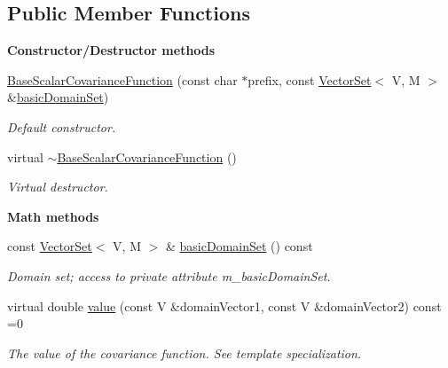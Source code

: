 \subsection*{Public Member Functions}
\begin{Indent}{\bf Constructor/\-Destructor methods}\par
\begin{DoxyCompactItemize}
\item 
\hyperlink{class_q_u_e_s_o_1_1_base_scalar_covariance_function_a7a3d53a332dffce97c5579d93eaf91ff}{Base\-Scalar\-Covariance\-Function} (const char $\ast$prefix, const \hyperlink{class_q_u_e_s_o_1_1_vector_set}{Vector\-Set}$<$ V, M $>$ \&\hyperlink{class_q_u_e_s_o_1_1_base_scalar_covariance_function_a703aa6a8e475adaface0ec514b48a5bc}{basic\-Domain\-Set})
\begin{DoxyCompactList}\small\item\em Default constructor. \end{DoxyCompactList}\item 
virtual \hyperlink{class_q_u_e_s_o_1_1_base_scalar_covariance_function_a5db872c7f5929e819543f7f58063f3ae}{$\sim$\-Base\-Scalar\-Covariance\-Function} ()
\begin{DoxyCompactList}\small\item\em Virtual destructor. \end{DoxyCompactList}\end{DoxyCompactItemize}
\end{Indent}
\begin{Indent}{\bf Math methods}\par
\begin{DoxyCompactItemize}
\item 
const \hyperlink{class_q_u_e_s_o_1_1_vector_set}{Vector\-Set}$<$ V, M $>$ \& \hyperlink{class_q_u_e_s_o_1_1_base_scalar_covariance_function_a703aa6a8e475adaface0ec514b48a5bc}{basic\-Domain\-Set} () const 
\begin{DoxyCompactList}\small\item\em Domain set; access to private attribute m\-\_\-basic\-Domain\-Set. \end{DoxyCompactList}\item 
virtual double \hyperlink{class_q_u_e_s_o_1_1_base_scalar_covariance_function_a93a35146e106c7fb28913c604a918acb}{value} (const V \&domain\-Vector1, const V \&domain\-Vector2) const =0
\begin{DoxyCompactList}\small\item\em The value of the covariance function. See template specialization. \end{DoxyCompactList}\end{DoxyCompactItemize}
\end{Indent}
